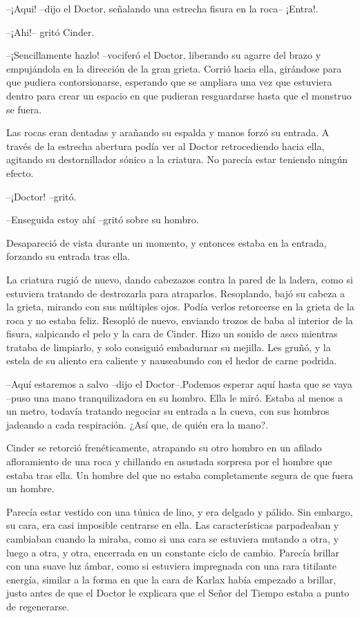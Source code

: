--¡Aqui! --dijo el Doctor, señalando una estrecha fisura en la roca-- ¡Entra!.

--¡Ahi!-- gritó Cinder.

--¡Sencillamente hazlo! --vociferó el Doctor, liberando su agarre del brazo y empujándola en la dirección de la gran grieta. Corrió hacia ella, girándose para que pudiera contorsionarse, esperando que se ampliara una vez que estuviera dentro para crear un espacio en que pudieran resguardarse hasta que el monstruo se fuera.

Las rocas eran dentadas y arañando su espalda y manos forzó su entrada. A través de la estrecha abertura podía ver al Doctor retrocediendo hacia ella, agitando su destornillador sónico a la criatura. No parecía estar teniendo ningún efecto. 



--¡Doctor! --gritó.

--Enseguida estoy ahí --gritó sobre su hombro.



Desapareció de vista durante un momento, y entonces estaba en la entrada, forzando su entrada tras ella.

La criatura rugió de nuevo, dando cabezazos contra la pared de la ladera, como si estuviera tratando de destrozarla para atraparlos. Resoplando, bajó su cabeza a la grieta, mirando con sus múltiples ojos. Podía verlos retorcerse en la grieta de la roca y no estaba feliz. Resopló de nuevo, enviando trozos de baba al interior de la fisura, salpicando el pelo y la cara de Cinder. Hizo un sonido de asco mientras trataba de limpiarlo, y solo consiguió embadurnar su mejilla. Les gruñó, y la estela de su aliento era caliente y nauseabundo con el hedor de carne podrida.



--Aquí estaremos a salvo --dijo el Doctor--.Podemos esperar aquí hasta que se vaya --puso una mano tranquilizadora en su hombro. Ella le miró. Estaba al menos a un metro, todavía tratando negociar su entrada a la cueva, con sus hombros jadeando a cada respiración. ¿Así que, de quién era la mano?.

Cinder se retorció frenéticamente, atrapando su otro hombro en un afilado afloramiento de una roca y chillando en asustada sorpresa por el hombre que estaba tras ella. Un hombre del que no estaba completamente segura de que fuera un hombre.

Parecía estar vestido con una túnica de lino, y era delgado y pálido. Sin embargo, su cara, era casi imposible centrarse en ella. Las características parpadeaban y cambiaban cuando la miraba, como si una cara se estuviera mutando a otra, y luego a otra, y otra, encerrada en un constante ciclo de cambio. Parecía brillar con una suave luz ámbar, como si estuviera impregnada con una rara titilante energía, similar a la forma en que la cara de Karlax había empezado a brillar, justo antes de que el Doctor le explicara que el Señor del Tiempo estaba a punto de regenerarse.

